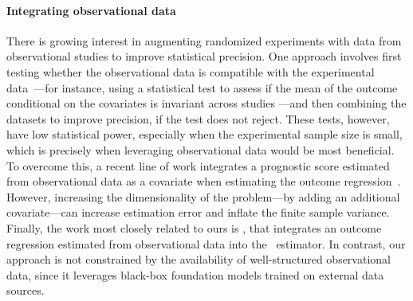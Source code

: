  



\paragraph{Integrating observational data} There is growing interest in augmenting randomized experiments with data from observational studies to improve statistical precision. One approach involves first testing whether the observational data is compatible with the experimental data~\citep{dahabreh2024using}---for instance, using a statistical test to assess if the mean of the outcome conditional on the covariates is invariant across studies \cite{luedtke2019omnibus,hussain2023falsification,de2024detecting}—and then combining the datasets to improve precision, if the test does not reject. These tests, however, have low statistical power, especially when the experimental sample size is small, which is precisely when leveraging observational data would be most beneficial. To overcome this, a recent line of work integrates a prognostic score estimated from observational data as a covariate when estimating the outcome regression~\citep{schuler2022increasing,liao2023prognostic}. However, increasing the dimensionality of the problem---by adding an additional covariate---can increase estimation error and inflate the finite sample variance. Finally, the work most closely related to ours is \citet{karlsson2024robust}, that integrates an outcome regression estimated from observational data into the \aipw~estimator. In contrast, our approach is not constrained by the availability of well-structured observational data, since it leverages black-box foundation models trained on external data sources.